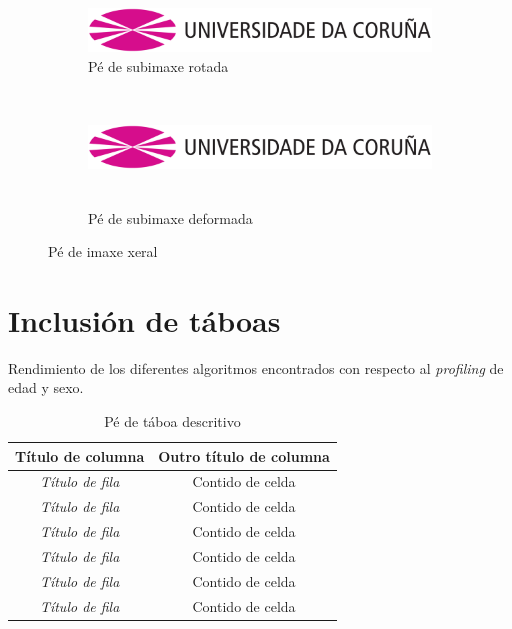 \begin{figure}[hp!]
  \centering
  \begin{subfigure}[c]{0.3\textwidth}
    \includegraphics[angle=45,width=\textwidth]{imaxes/udc.png}
    \caption{Pé de subimaxe rotada}
    \label{fig:subfigura-rotada}
  \end{subfigure}
  \hspace{0.1\textwidth}
  \begin{subfigure}[c]{0.3\textwidth}
    \includegraphics[width=\textwidth,height=3cm]{imaxes/udc.png}
    \caption{Pé de subimaxe deformada}
    \label{fig:subfigura-deformada}
  \end{subfigure}
  \caption{Pé de imaxe xeral}
  \label{fig:exemplo-subfiguras}
\end{figure}

\section{Inclusión de táboas}

Rendimiento de los diferentes algoritmos encontrados con respecto al \textit{profiling} de edad y sexo.

\begin{table}[hp!]
  \centering
  \begin{tabular}{c|c}
    \rowcolor{udcpink!25}
    \textbf{Título de columna} & \textbf{Outro título de columna} \\\hline
    \textit{Título de fila}    & Contido de celda                 \\
    \textit{Título de fila}    & Contido de celda                 \\
    \textit{Título de fila}    & Contido de celda                 \\
    \textit{Título de fila}    & Contido de celda                 \\
    \textit{Título de fila}    & Contido de celda                 \\
    \textit{Título de fila}    & Contido de celda                 \\
  \end{tabular}
  \caption{Pé de táboa descritivo}
  \label{tab:exemplo}
\end{table}

